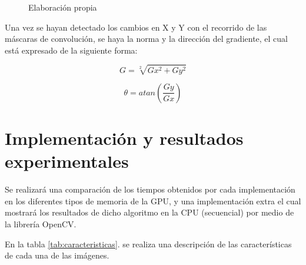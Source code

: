 \documentclass[10pt,journal,compsoc]{IEEEtran}
\begin{document}
\begin{figure}[ht]
\centering
    \hspace{0.1cm}
    \hspace{0.1cm}
\caption{Elaboración propia}
\end{figure} 


Una vez se hayan detectado los cambios en X y Y con el recorrido de las máscaras de convolución, se haya la norma y la dirección del gradiente, el cual está expresado de la siguiente forma:

\begin{equation}
G = \sqrt[2]{Gx^2+Gy^2}
\end{equation}

\begin{equation}
\theta = atan\left(\frac{Gy}{Gx}\right)
\end{equation}

\cite{SD_openCV}\cite{sobelED}


\section{Implementación y resultados experimentales}

Se realizará una comparación de los tiempos obtenidos por cada implementación en los diferentes tipos de memoria de la GPU, y una implementación extra el cual mostrará los resultados de dicho algoritmo en la CPU (secuencial) por medio de la librería OpenCV.

En la tabla \ref{tab:caracteristicas}. se realiza una descripción de las características de cada una de las imágenes.
\end{document}
